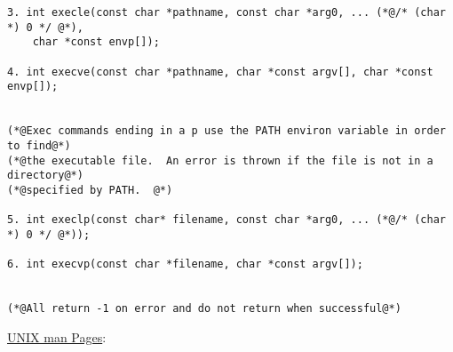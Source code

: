 \documentclass[12pt]{extarticle}
\newenvironment{myindentpar}[1]%
 {\begin{list}{}%
         {\setlength{\leftmargin}{#1}}%
         \item[]%
 }
 {\end{list}}
\begin{document}
\begin{myindentpar}{5mm}
\begin{lstlisting}[frame=single]
3. int execle(const char *pathname, const char *arg0, ... (*@/* (char *) 0 */ @*), 
    char *const envp[]);

4. int execve(const char *pathname, char *const argv[], char *const envp[]);


(*@Exec commands ending in a p use the PATH environ variable in order to find@*)
(*@the executable file.  An error is thrown if the file is not in a directory@*)
(*@specified by PATH.  @*)

5. int execlp(const char* filename, const char *arg0, ... (*@/* (char *) 0 */ @*));

6. int execvp(const char *filename, char *const argv[]);


(*@All return -1 on error and do not return when successful@*)
\end{lstlisting}

\end{myindentpar}

\newpage
\noindent
{\large \underline{UNIX man Pages}:}
\end{document}
